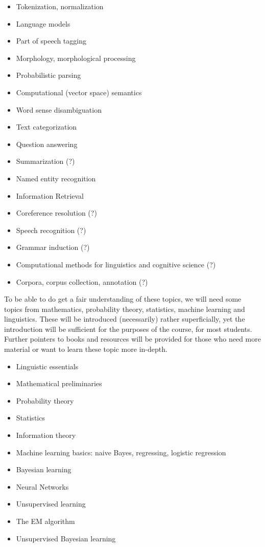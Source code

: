 \begin{itemize}
  \item Tokenization, normalization
  \item Language models
  \item Part of speech tagging
  \item Morphology, morphological processing
  \item Probabilistic parsing
  \item Computational (vector space) semantics
  \item Word sense disambiguation
  \item Text categorization
  \item Question answering
  \item Summarization (?)
  \item Named entity recognition
  \item Information Retrieval
  \item Coreference resolution (?)
  \item Speech recognition (?)
  \item Grammar induction (?)
  \item Computational methods for linguistics and cognitive science (?)
  \item Corpora, corpus collection, annotation (?)
\end{itemize}

To be able to do get a fair understanding of these topics,
we will need some topics from mathematics,
probability theory, statistics, machine learning and linguistics.
These will be introduced (necessarily) rather superficially,
yet the introduction will be sufficient for the purposes of the course,
for most students.
Further pointers to books and resources will be provided for those
who need more material or want to learn these topic more in-depth.

\begin{itemize}
  \item Linguistic essentials
  \item Mathematical preliminaries
  \item Probability theory
  \item Statistics
  \item Information theory
  \item Machine learning basics: naive Bayes, regressing, logistic regression
  \item Bayesian learning
  \item Neural Networks
  \item Unsupervised learning
  \item The EM algorithm
  \item Unsupervised Bayesian learning
\end{itemize}
